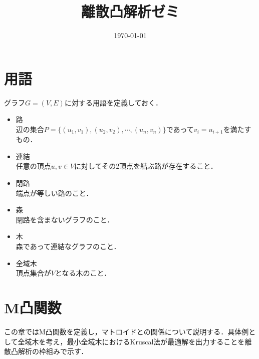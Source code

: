 \documentclass[a4paper]{jsarticle}
\title{離散凸解析ゼミ}
\date{\today}
\theoremstyle{break}
\begin{document}
\maketitle
\section*{用語}
グラフ$G=(V,E)$に対する用語を定義しておく．
\begin{itemize}
  \item 路 \\
    辺の集合$P = \{(u_1,v_1),(u_2,v_2),\cdots,(u_n,v_n)\}$であって$v_i = u_{i+1}$を満たすもの．
  \item 連結 \\
    任意の頂点$u,v\in V$に対してその2頂点を結ぶ路が存在すること．
  \item 閉路 \\
    端点が等しい路のこと．
  \item 森 \\
    閉路を含まないグラフのこと．
  \item 木 \\
    森であって連結なグラフのこと．
  \item 全域木 \\
    頂点集合が$V$となる木のこと．
\end{itemize}
\section{M凸関数}
この章ではM凸関数を定義し，マトロイドとの関係について説明する．具体例として全域木を考え，最小全域木におけるKruscal法が最適解を出力することを離散凸解析の枠組みで示す．
\end{document}
